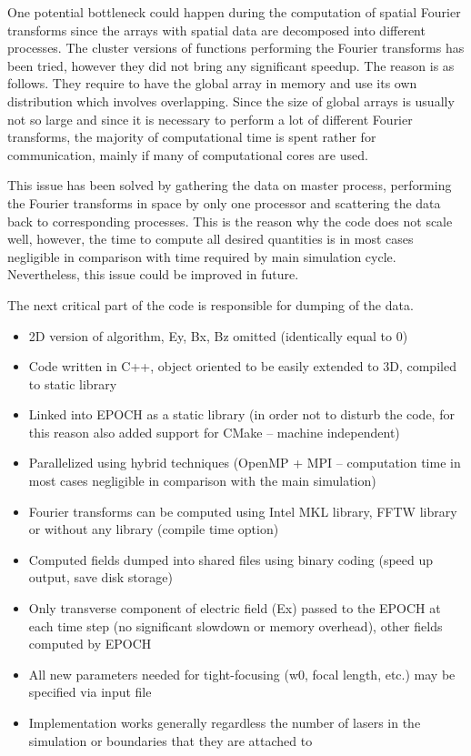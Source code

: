 One potential bottleneck could happen during the computation of spatial Fourier transforms since the arrays with spatial data are decomposed into different processes. The cluster versions of functions performing the Fourier transforms has been tried, however they did not bring any significant speedup. The reason is as follows. They require to have the global array in memory and use its own distribution which involves overlapping. Since the size of global arrays is usually not so large and since it is necessary to perform a lot of different Fourier transforms, the majority of computational time is spent rather for communication, mainly if many of computational cores are used.

This issue has been solved by gathering the data on master process, performing the Fourier transforms in space by only one processor and scattering the data back to corresponding processes. This is the reason why the code does not scale well, however, the time to compute all desired quantities is in most cases negligible in comparison with time required by main simulation cycle. Nevertheless, this issue could be improved in future.

The next critical part of the code is responsible for dumping of the data.

\begin{itemize}
	\item 2D version of algorithm, Ey, Bx, Bz omitted (identically equal to 0) 
	\item Code written in C++, object oriented to be easily extended to 3D, compiled to static library
	\item Linked into EPOCH as a static library (in order not to disturb the code, for this reason also added support for CMake – machine independent)
	\item Parallelized using hybrid techniques (OpenMP + MPI – computation time in most cases negligible in comparison with the main simulation)
	\item Fourier transforms can be computed using Intel MKL library, FFTW library or without any library (compile time option)
	\item Computed fields dumped into shared files using binary coding (speed up output, save disk storage)
	\item Only transverse component of electric field (Ex) passed to the EPOCH at each time step (no significant slowdown or memory overhead), other fields computed by EPOCH
	\item All new parameters needed for tight-focusing (w0, focal length, etc.) may be specified via input file
	\item Implementation works generally regardless the number of lasers in the simulation or boundaries that they are attached to
\end{itemize}

